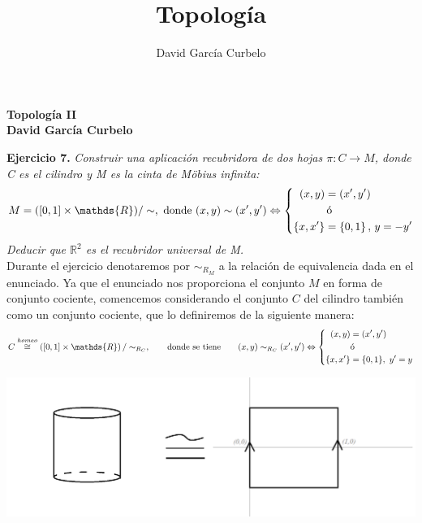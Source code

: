 \documentclass[fleqn]{article}
\author{David García Curbelo}
\title{Topología}
\def\R{\mathds{R}}
\begin{document}
    \setcounter{page}{1}
    \pagestyle{plain}

    \begin{center}
        {\large\bf{Topología II}} \\
        \bf{David García Curbelo}\\
        
    \end{center}

    \textbf{Ejercicio 7. } \textit{Construir una aplicación recubridora de dos hojas $\pi : C \rightarrow M$, donde C es el cilindro y M es 
            la cinta de Möbius infinita:}
            $$M = ([0,1] \times \R)/\sim, \text{ donde } (x,y) \sim (x',y') \Leftrightarrow 
            \left\{  
                \begin{aligned}
                    (x,y) &= (x',y') \\
                    &\thinspace \text{ó} \\
                    \{x,x'\} &= \{0,1\} \thinspace, \thinspace y = -y'\\
                \end{aligned}
            \right.$$
            \textit{Deducir que $\R^2$ es el recubridor universal de M.}\\

    
    Durante el ejercicio denotaremos por $\sim_{R_M}$ a la relación de equivalencia dada en el enunciado.
    Ya que el enunciado nos proporciona el conjunto $M$ en forma de conjunto cociente, comencemos considerando el conjunto $C$ del cilindro 
    también como un conjunto cociente, que lo definiremos de la siguiente manera:
    $$ C \overset{homeo}{\cong} \left([0,1] \times \R\right) / \sim_{R_C}, \quad \quad \text{donde se tiene} \quad \quad (x,y) \sim_{R_C} (x',y') \Leftrightarrow 
    \left\{ 
        \begin{aligned}
            (x,y) &= (x', y')\\
            &\text{ó}\\
            \{x,x'\} &= \{0,1\}, \thinspace \thinspace y'=y
        \end{aligned}
    \right.$$

    \begin{center}
        \noindent
        \includegraphics[width=0.6\linewidth]{cilindro.png}
    \end{center}
    
\end{document}
